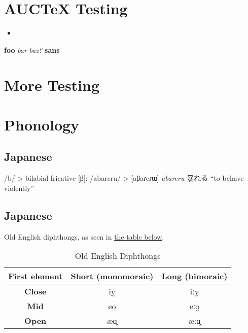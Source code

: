 \documentclass[a4paper,12pt,twoside]{article}
\begin{document}
\section{AUCTeX Testing}
\label{sec:auctex-testing}

\begin{itemize}
\item
\end{itemize}

\textbf{foo}
\textit{bar}
\emph{baz?}
\textbf{sans}

{}


\section{More Testing}
\label{sec:foo-bar-baz}



\section{Phonology}\label{sec:phonology}
\subsection{Japanese}\label{ssec:phonology-japanese}

/b/ > bilabial fricative [β]: /abareru/ > [aβaɾeɾɯ] \textit{abareru} 暴れる ``to behave violently''


\subsection{Japanese}\label{ssec:phonology-oldenglish}


Old English diphthongs, as seen in \hyperref[tab:oe-diphthongs]{the table below}.

\begin{table}
  \caption{Old English Diphthongs}
  \label{tab:oe-diphthongs}

  \begin{tabular}{|c|c|c|}

    \hline
    \textbf{First element} & \textbf{Short (monomoraic)} & \textbf{Long (bimoraic)} \\
    \hline
    \textbf{Close} & iy̯ & iːy̯ \\
    \hline
    \textbf{Mid} & eo̯ & eːo̯ \\
    \hline
    \textbf{Open} & æɑ̯ & æːɑ̯ \\
    \hline

  \end{tabular}

\end{table}
\end{document}

